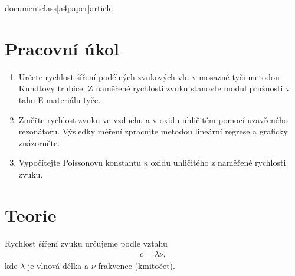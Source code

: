 documentclass[a4paper]{article}
\usepackage{kantlipsum} 
\usepackage[utf8]{inputenc}
\usepackage[czech]{babel}
\usepackage[T1]{fontenc}
\usepackage{amsmath}
\usepackage{fullpage}
\usepackage{graphicx}
\usepackage{txfonts}
\usepackage{gensymb}
\usepackage{eurosym}
\usepackage[symbol*]{footmisc}
\usepackage{mathtools}
\usepackage{enumitem}
\usepackage{tabularx,ragged2e,booktabs,caption}
\author{"Václav Kubíček"}


\section{Pracovní úkol}
\begin{enumerate}%
\item Určete rychlost šíření podélných  zvukových vln v mosazné tyči metodou Kundtovy trubice. Z naměřené rychlosti zvuku stanovte modul pružnosti v tahu E materiálu tyče.
\item Změřte rychlost zvuku ve vzduchu a v oxidu uhličitém pomocí uzavřeného rezonátoru. Výsledky měření zpracujte metodou lineární regrese a graficky znázorněte.
\item Vypočítejte Poissonovu konstantu κ oxidu uhličitého z naměřené rychlosti zvuku.
\end{enumerate}

\section{ Teorie}
\item Rychlost šíření zvuku určujeme podle vztahu
\begin{align}
    c = \lambda \nu,
\end{align}
kde $\lambda$ je vlnová délka a $\nu$ frakvence (kmitočet).

